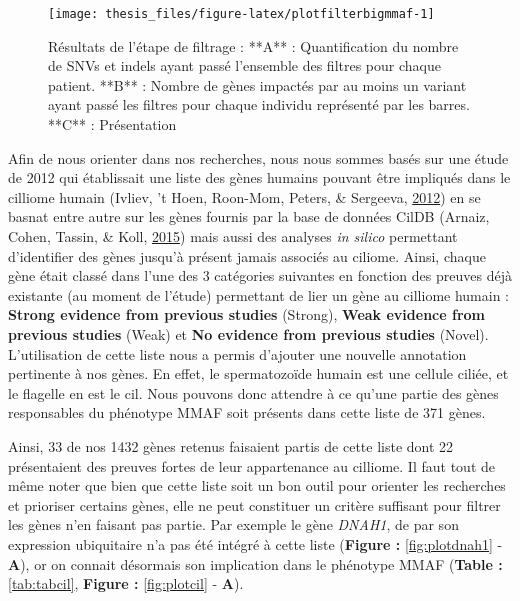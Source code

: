 \documentclass[12pt,twoside]{reedthesis}
\theoremstyle{definition}
\theoremstyle{definition}
\theoremstyle{remark}
\begin{document}
  \begin{figure}
  
  {\centering \texttt{[image: thesis\_files/figure-latex/plotfilterbigmmaf-1]} 
  
  }
  
  \caption[Résultats de l'étape de filtrage]{Résultats de l'étape de filtrage : **A** : Quantification du nombre de SNVs et indels ayant passé l'ensemble des filtres pour chaque patient. **B** : Nombre de gènes impactés par au moins un variant ayant passé les filtres pour chaque individu représenté par les barres. **C** : Présentation }\label{fig:plotfilterbigmmaf}
  \end{figure}
  
  \newpage
  
  Afin de nous orienter dans nos recherches, nous nous sommes basés sur
  une étude de 2012 qui établissait une liste des gènes humains pouvant
  être impliqués dans le cilliome humain (Ivliev, 't Hoen, Roon-Mom,
  Peters, \& Sergeeva, \protect\hyperlink{ref-Ivliev2012}{2012}) en se
  basnat entre autre sur les gènes fournis par la base de données CilDB
  (Arnaiz, Cohen, Tassin, \& Koll,
  \protect\hyperlink{ref-Arnaiz2015}{2015}) mais aussi des analyses
  \emph{in silico} permettant d'identifier des gènes jusqu'à présent
  jamais associés au ciliome. Ainsi, chaque gène était classé dans l'une
  des 3 catégories suivantes en fonction des preuves déjà existante (au
  moment de l'étude) permettant de lier un gène au cilliome humain :
  \textbf{Strong evidence from previous studies} (Strong), \textbf{Weak
  evidence from previous studies} (Weak) et \textbf{No evidence from
  previous studies} (Novel). L'utilisation de cette liste nous a permis
  d'ajouter une nouvelle annotation pertinente à nos gènes. En effet, le
  spermatozoïde humain est une cellule ciliée, et le flagelle en est le
  cil. Nous pouvons donc attendre à ce qu'une partie des gènes
  responsables du phénotype MMAF soit présents dans cette liste de 371
  gènes.
  
  Ainsi, 33 de nos 1432 gènes retenus faisaient partis de cette liste dont
  22 présentaient des preuves fortes de leur appartenance au cilliome. Il
  faut tout de même noter que bien que cette liste soit un bon outil pour
  orienter les recherches et prioriser certains gènes, elle ne peut
  constituer un critère suffisant pour filtrer les gènes n'en faisant pas
  partie. Par exemple le gène \emph{DNAH1}, de par son expression
  ubiquitaire n'a pas été intégré à cette liste (\textbf{Figure :
  }\ref{fig:plotdnah1} - \textbf{A}), or on connait désormais son
  implication dans le phénotype MMAF (\textbf{Table :} \ref{tab:tabcil},
  \textbf{Figure : }\ref{fig:plotcil} - \textbf{A}).
  
\end{document}
